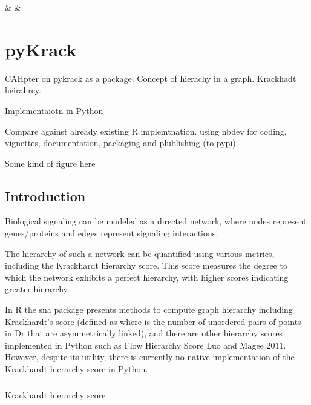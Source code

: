 \begin{table}
  \centering
  {\csvcoli & \csvcolii & \csvcoliii}
  \label{tab:your-table}
\end{table}


\chapter{pyKrack}
\label{appendix:pykrack}

CAHpter on pykrack as a package. Concept of hierachy in a graph. Krackhadt heirahrcy. 

Implementaiotn in Python

Compare against already existing R implemtnation.
using nbdev for coding, vignettes, documentation, packaging and plublishing (to pypi).

Some kind of figure here

\section*{Introduction}

Biological signaling can be modeled as a directed network, where nodes represent genes/proteins and edges represent signaling interactions.

The hierarchy of such a network can be quantified using various metrics, including the Krackhardt hierarchy score. This score measures the degree to which the network exhibits a perfect hierarchy, with higher scores indicating greater hierarchy.

In R the sna package presents methods to compute graph hierarchy including Krackhardt’s score (defined as
where is the number of unordered pairs of points in Dr that are asymmetrically linked), and there are other hierarchy scores implemented in Python such as Flow Hierarchy Score Luo and Magee 2011. However, despite its utility, there is currently no native implementation of the Krackhardt hierarchy score in Python.

\subsection{}{Krackhardt hierarchy score}

